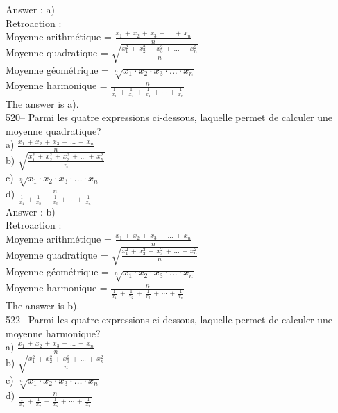 ﻿\documentclass[letterpaper, 12pt]{article}
\begin{document}
Answer : a)\\

Retroaction : \\
Moyenne arithm\'etique =
$\frac{x_1\,+\,x_2\,+\,x_3\,+\,\ldots\,+\,x_n}{n}$\\[2mm]
Moyenne quadratique =
$\sqrt{\frac{x_1^{2}\,+\,x_2^{2}\,+\,x_3^{2}\,+\,\ldots\,+\,x_n^{2}}{n}}$\\[2mm]
Moyenne g\'eom\'etrique = $\sqrt[n]{x_1\cdot x_2\cdot x_3 \cdot \ldots \cdot
x_n}$\\[2mm]
Moyenne harmonique =
$\frac{n}{\frac{1}{x_1}\,+\,\frac{1}{x_2}\,+\,\frac{1}{x_3}\,+\,\cdots\,+\,\frac{1}{x_n}}$\\[2mm]
The answer is a).\\

520-- Parmi les quatre expressions ci-dessous, laquelle permet de calculer
une moyenne quadratique?\\
a) $\frac{x_1\,+\,x_2\,+\,x_3\,+\,\ldots\,+\,x_n}{n}$\\[2mm]
b)
$\sqrt{\frac{x_1^{2}\,+\,x_2^{2}\,+\,x_3^{2}\,+\,\ldots\,+\,x_n^{2}}{n}}$\\[2mm]
c) $\sqrt[n]{x_1 \cdot x_2 \cdot x_3 \cdot \ldots \cdot x_n}$\\[2mm]
d)
$\frac{n}{\frac{1}{x_1}\,+\,\frac{1}{x_2}\,+\,\frac{1}{x_3}\,+\,\cdots\,+\,\frac{1}{x_n}}$\\

Answer : b)\\

Retroaction : \\
Moyenne arithm\'etique =
$\frac{x_1\,+\,x_2\,+\,x_3\,+\,\ldots\,+\,x_n}{n}$\\[2mm]
Moyenne quadratique =
$\sqrt{\frac{x_1^{2}\,+\,x_2^{2}\,+\,x_3^{2}\,+\,\ldots\,+\,x_n^{2}}{n}}$\\[2mm]
Moyenne g\'eom\'etrique = $\sqrt[n]{x_1\cdot x_2\cdot x_3 \cdot \ldots \cdot
x_n}$\\[2mm]
Moyenne harmonique =
$\frac{n}{\frac{1}{x_1}\,+\,\frac{1}{x_2}\,+\,\frac{1}{x_3}\,+\,\cdots\,+\,\frac{1}{x_n}}$\\[2mm]
The answer is b).\\


522-- Parmi les quatre expressions ci-dessous, laquelle permet de calculer
une moyenne harmonique?\\
a) $\frac{x_1\,+\,x_2\,+\,x_3\,+\,\ldots\,+\,x_n}{n}$\\[2mm]
b)
$\sqrt{\frac{x_1^{2}\,+\,x_2^{2}\,+\,x_3^{2}\,+\,\ldots\,+\,x_n^{2}}{n}}$\\[2mm]
c) $\sqrt[n]{x_1 \cdot x_2 \cdot x_3 \cdot \ldots \cdot x_n}$\\[2mm]
d)
$\frac{n}{\frac{1}{x_1}\,+\,\frac{1}{x_2}\,+\,\frac{1}{x_3}\,+\,\cdots\,+\,\frac{1}{x_n}}$\\
\end{document}
